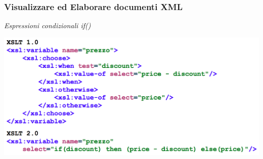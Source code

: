 \begin{frame}
    \frametitle{Visualizzare ed Elaborare documenti XML}
    \addtocounter{nframe}{1}
    
        \textit{Espressioni condizionali if()}

    \begin{center}
        \includegraphics[width=.95\textwidth]{imgs/esempio-espressioneCondizionale.png}
    \end{center}

\end{frame}



